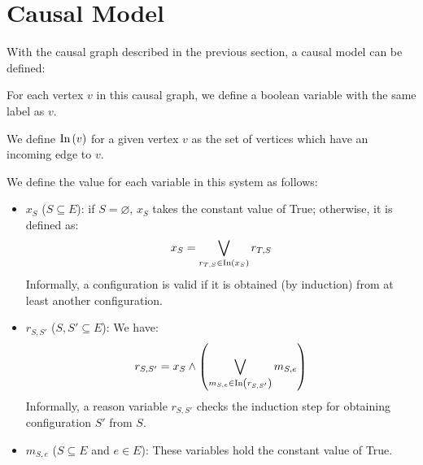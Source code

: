 \section{Causal Model}

With the causal graph described in the previous section,
a causal model can be defined:

For each vertex $v$ in this causal graph, we define a
boolean variable with the same label as $v$.

We define $\text{In} \left( v \right)$ for a given vertex $v$ as the set of vertices
which have an incoming edge to $v$.

We define the value for each variable in this system as follows:

\begin{itemize}
  \item $x_{S}$ ($S \subseteq E$): if $S = \varnothing$, $x_S$
  takes the constant value of True; otherwise, it is defined as:
  \[ x_S = \bigvee_{r_{T,S} \in \text{In} \left( x_S \right)} r_{T,S} \]
  Informally, a configuration is valid if it is obtained (by induction)
  from at least another configuration. 
  \item $r_{S,S'}$ ($S,S' \subseteq E$): We have:
  \[ r_{S,S'} = x_S \wedge
    \left( \bigvee_{m_{S,e} \in \text{In} \left( r_{S,S'} \right)} m_{S,e} \right) \]
  Informally, a reason variable $r_{S,S'}$ checks the induction step for
  obtaining configuration $S'$ from $S$.
  \item $m_{S,e}$ ($S \subseteq E$ and $e \in E$): These variables hold
  the constant value of True.  
\end{itemize}
